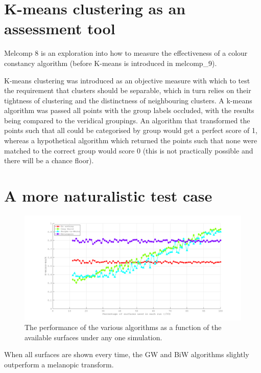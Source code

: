 \section{K-means clustering as an assessment tool}

Melcomp 8 is an exploration into how to measure the effectiveness of a colour constancy algorithm (before K-means is introduced in melcomp\_9).

K-means clustering was introduced as an objective measure with which to test the requirement that clusters should be separable, which in turn relies on their tightness of clustering and the distinctness of neighbouring clusters. A k-means algorithm was passed all points with the group labels occluded, with the results being compared to the veridical groupings. An algorithm that transformed the points such that all could be categorised by group would get a perfect score of 1, whereas a hypothetical algorithm which returned the points such that none were matched to the correct group would score 0 (this is not practically possible and there will be a chance floor).


\section{A more naturalistic test case}

\begin{figure}[htbp]
 \includegraphics[max width=\textwidth]{figs/comp/melcomp_9/4a_summary.png}
 \caption{The performance of the various algorithms as a function of the available surfaces under any one simulation.}
 \label{fig:4asum}
\end{figure} 

When all surfaces are shown every time, the \gls{GW} and \gls{BiW} algorithms slightly outperform a melanopic transform.


